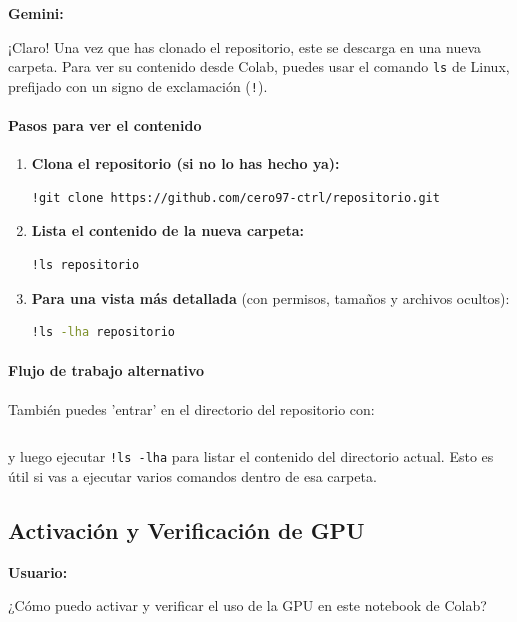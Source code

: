 \documentclass[12pt, a4paper]{article}
\newenvironment{usuario}{\par\noindent\textbf{Usuario:}\itshape\par\ignorespaces}{\par}
\newenvironment{gemini}{\par\noindent\textbf{Gemini:}\par\ignorespaces}{\par}
\begin{document}
\begin{gemini}
    ¡Claro! Una vez que has clonado el repositorio, este se descarga en una nueva carpeta. 
    Para ver su contenido desde Colab, puedes usar el comando \texttt{ls} de Linux, 
    prefijado con un signo de exclamación (\texttt{!}).

    \paragraph{Pasos para ver el contenido}
    \begin{enumerate}
        \item \textbf{Clona el repositorio (si no lo has hecho ya):}
        \begin{lstlisting}[language=bash]
            !git clone https://github.com/cero97-ctrl/repositorio.git
        \end{lstlisting}
        \item \textbf{Lista el contenido de la nueva carpeta:}
        \begin{lstlisting}[language=bash]
            !ls repositorio
        \end{lstlisting}
        \item \textbf{Para una vista más detallada} (con permisos, tamaños y archivos ocultos):
        \begin{lstlisting}[language=bash]
!ls -lha repositorio
        \end{lstlisting}
    \end{enumerate}

    \paragraph{Flujo de trabajo alternativo}
        También puedes 'entrar' en el directorio del repositorio con:
        \begin{lstlisting}[language=bash] 
            %cd repositorio
        \end{lstlisting}
        y luego ejecutar \texttt{!ls -lha} para listar el contenido del directorio actual. Esto es útil si vas a ejecutar varios 
        comandos dentro de esa carpeta.
\end{gemini}


\subsection{Activación y Verificación de GPU}

\begin{usuario}
¿Cómo puedo activar y verificar el uso de la GPU en este 
notebook de Colab?
\end{usuario}
\end{document}
